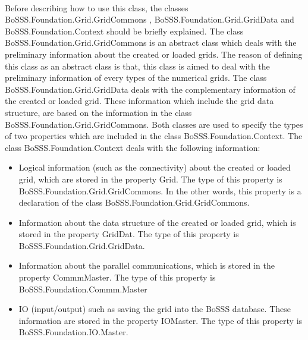 \documentclass[11pt,twoside,a4paper]{fdyartcl}
\begin{document}
\paragraph{} Before describing how to use this class, the classes {\scriptsize BoSSS.Foundation.Grid.GridCommons} ,   {\scriptsize BoSSS.Foundation.Grid.GridData} and {\scriptsize BoSSS.Foundation.Context} should be briefly explained. The class {\scriptsize BoSSS.Foundation.Grid.GridCommons} is an abstract class which deals with the preliminary information about the created or loaded grids. The reason of defining this class as an abstract class is that, this class is aimed to deal with the preliminary information of every types of the numerical grids. The class {\scriptsize BoSSS.Foundation.Grid.GridData} deals with the complementary information of the created or loaded grid. These information which include the grid data structure, are based on the information in the class {\scriptsize BoSSS.Foundation.Grid.GridCommons}. Both classes are used to specify the types of two properties which are included in the class {\scriptsize BoSSS.Foundation.Context}. The class {\scriptsize BoSSS.Foundation.Context} deals with the following information:
\begin{itemize}
\item Logical information (such as the connectivity) about the created or loaded grid, which are stored in the property {\scriptsize Grid}. The type of this property is {\scriptsize BoSSS.Foundation.Grid.GridCommons}. In the other words, this property is a declaration of the class {\scriptsize BoSSS.Foundation.Grid.GridCommons}.
\item Information about the data structure of the created or loaded grid, which is stored in the property {\scriptsize GridDat}. The type of this property is {\scriptsize BoSSS.Foundation.Grid.GridData}.
\item Information about the parallel communications, which is stored in the property {\scriptsize CommmMaster}. The type of this property is {\scriptsize BoSSS.Foundation.Commm.Master}
\item IO (input/output) such as saving the grid into the BoSSS database. These information are stored in the property {\scriptsize IOMaster}. The type of this property is {\scriptsize BoSSS.Foundation.IO.Master}.
\end{itemize}
\end{document}

